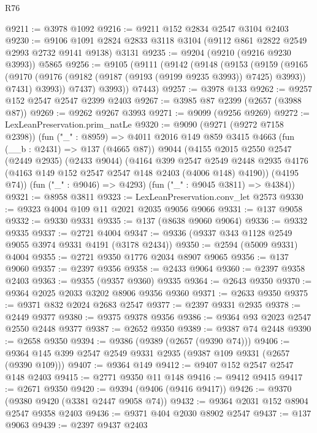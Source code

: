 \begin{lexlean}{R76}
\begin{coremodule}
@9211 := @3978 @1092
@9216 := @9211 @152 @2834 @2547 @3104 @2403
@9230 := @9106 @1091 @2824 @2833 @3118 @3104 (@9112 @861 @2822 @2549 @2993 @2732 @9141 @9138) @3131
@9235 := @9204 (@9210 (@9216 @9230 @3993)) @5865
@9256 := @9105
    (@9111
      (@9142
        (@9148
          (@9153
            (@9159
              (@9165
                (@9170 (@9176 (@9182 (@9187 (@9193 (@9199 @9235 @3993)) @7425) @3993)) @7431)
                @3993))
            @7437)
          @3993))
      @7443)
@9257 := @3978 @133
@9262 := @9257 @152 @2547 @2547 @2399 @2403
@9267 := @3985 @87 @2399 (@2657 (@3988 @87))
@9269 := @9262 @9267 @3993
@9271 := @9099 (@9256 @9269)
@9272 := LexLeanPreservation.prim_natLe
@9320 := @9090
    (@9271 (@9272 @7158 @2398))
    (fun ("_" : @8959) =>
    @4011
      @2016
      @149
      @859
      @3415
      @4663
      (fun (__b : @2431) => @137 (@4665 @87))
      @9044
      (@4155
        @2015
        @2550
        @2547
        (@2449 @2935)
        (@2433 @9044)
        (@4164
          @399
          @2547
          @2549
          @2448
          @2935
          @4176
          (@4163 @149 @152 @2547 @2547 @148 @2403 (@4006 @148) @4190))
        (@4195 @74))
      (fun ("_" : @9046) => @4293)
      (fun ("_" : @9045 @3811) => @4384))
@9321 := @8958 @3811
@9323 := LexLeanPreservation.conv_let @2573
@9330 := @9323 @4004 @109 @11 @2021 @2035 @9056 @9066
@9331 := @137 @9058
@9332 := @9330 @9331
@9335 := @137 (@8638 @9060 @9064)
@9336 := @9332 @9335
@9337 := @2721 @4004
@9347 := @9336 (@9337 @343 @1128 @2549 @9055 @3974 @9331 @4191 (@3178 @2434))
@9350 := @2594 (@5009 @9331) @4004
@9355 := @2721 @9350 @1776 @2034 @8907 @9065
@9356 := @137 @9060
@9357 := @2397 @9356
@9358 := @2433 @9064
@9360 := @2397 @9358 @2403
@9363 := @9355 (@9357 @9360) @9335
@9364 := @2643 @9350
@9370 := @9364 @2025 @2033 @3202 @8906 @9356 @9360
@9371 := @2633 @9350
@9375 := @9371 @832 @2024 @2683 @2547
@9377 := @2397 @9331 @2935
@9378 := @2449 @9377
@9380 := @9375 @9378 @9356
@9386 := @9364 @93 @2023 @2547 @2550 @2448 @9377
@9387 := @2652 @9350
@9389 := @9387 @74 @2448
@9390 := @2658 @9350
@9394 := @9386 (@9389 (@2657 (@9390 @74)))
@9406 := @9364 @145 @399 @2547 @2549 @9331 @2935 (@9387 @109 @9331 (@2657 (@9390 @109)))
@9407 := @9364 @149
@9412 := @9407 @152 @2547 @2547 @148 @2403
@9415 := @2771 @9350 @11 @148
@9416 := @9412 @9415
@9417 := @2671 @9350
@9420 := @9394 (@9406 (@9416 @9417))
@9426 := @9370 (@9380 @9420 (@3381 @2447 @9058 @74))
@9432 := @9364 @2031 @152 @8904 @2547 @9358 @2403
@9436 := @9371 @404 @2030 @8902 @2547
@9437 := @137 @9063
@9439 := @2397 @9437 @2403

\end{coremodule}
\end{lexlean}
